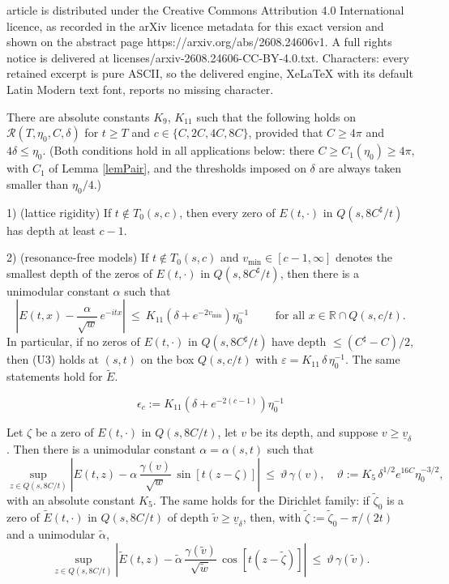 \documentclass[10pt,a4paper]{amsart}
\def\RR{{\mathcal{R}}}
\def\R{{\mathbb R}}
\def\a{\alpha}
\def\d{\delta}
\def\e{\varepsilon}
\def\g{\gamma}
\def\ti{\tilde}
\def\uv{\underline{v}_{\d}}
\begin{document}
article is distributed under the Creative Commons Attribution 4.0 International licence, as recorded in the arXiv licence metadata for this exact version and shown on the abstract page https://arxiv.org/abs/2608.24606v1. A full rights notice is delivered at licenses/arxiv-2608.24606-CC-BY-4.0.txt. Characters: every retained excerpt is pure ASCII, so the delivered engine, XeLaTeX with its default Latin Modern text font, reports no missing character.
\begin{proposition}\label{propU3}
There are absolute constants $K_9$, $K_{11}$ such that the following holds on $\RR(T,\eta_0,C,\d)$ for $t\geq T$ and $c\in\{C,2C,4C,8C\}$, provided that $C\geq4\pi$ and $4\d\leq\eta_0$. (Both conditions hold in all applications below: there $C\geq C_1(\eta_0)\geq4\pi$, with $C_1$ of Lemma \ref{lemPair}, and the thresholds imposed on $\d$ are always taken smaller than $\eta_0/4$.)

1) {\rm(lattice rigidity)} If $t\notin T_0(s,c)$, then every zero of $E(t,\cdot)$ in $Q(s,8C^\sharp/t)$ has depth at least $c-1$.

2) {\rm(resonance-free models)} If $t\notin T_0(s,c)$ and $v_{\min}\in[c-1,\infty]$ denotes the smallest depth of the zeros of $E(t,\cdot)$ in $Q(s,8C^\sharp/t)$, then there is a unimodular constant $\a$ such that
$$\left|E(t,x)-\frac{\a}{\sqrt w}\,e^{-itx}\right|\ \leq\ K_{11}\left(\d+e^{-2v_{\min}}\right)\eta_0^{-1}
\qquad\text{ for all }x\in\R\cap Q(s,c/t).$$
In particular, if no zeros of $E(t,\cdot)$ in $Q(s,8C^\sharp/t)$ have depth $\leq(C^\sharp-C)/2$, then (U3) holds at $(s,t)$ on the box $Q(s,c/t)$ with $\e=K_{11}\,\d\,\eta_0^{-1}$. The same statements hold for $\ti E$.
\end{proposition}

\begin{equation}
\epsilon_c:=K_{11}\left(\d+e^{-2(c-1)}\right)\eta_0^{-1}
\label{eqEpsU3}
\end{equation}

\begin{lemma}\label{lemRep}
Let $\zeta$ be a zero of $E(t,\cdot)$ in $Q(s,8C/t)$, let $v$ be its depth, and suppose $v\geq\uv$. Then there is a unimodular constant $\a=\a(s,t)$ such that
\begin{equation}
\sup_{z\in Q(s,8C/t)}\left|E(t,z)-\a\,\frac{\g(v)}{\sqrt{w}}\,\sin[t(z-\zeta)]\right|\ \leq\ \vartheta\,\g(v),
\quad
\vartheta:=K_5\,\d^{1/2}e^{16C}\eta_0^{-3/2},
\label{eqRepE}
\end{equation}
with an absolute constant $K_5$. The same holds for the Dirichlet family: if $\ti\zeta_0$ is a zero of $\ti E(t,\cdot)$ in $Q(s,8C/t)$ of depth $\ti v\geq\uv$, then, with $\ti\zeta:=\ti\zeta_0-\pi/(2t)$ and a unimodular $\ti\a$,
\begin{equation}
\sup_{z\in Q(s,8C/t)}\left|\ti E(t,z)-\ti\a\,\frac{\g(\ti v)}{\sqrt{\ti w}}\,\cos[t(z-\ti\zeta)]\right|\ \leq\ \vartheta\,\g(\ti v).
\label{eqRepEt}
\end{equation}
\end{lemma}
\end{document}

